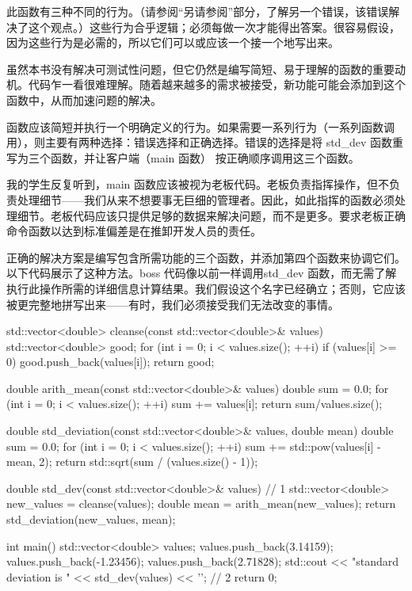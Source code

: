 
此函数有三种不同的行为。（请参阅“另请参阅”部分，了解另一个错误，该错误解决了这个观点。）这些行为合乎逻辑；必须每做一次才能得出答案。很容易假设，因为这些行为是必需的，所以它们可以或应该一个接一个地写出来。

虽然本书没有解决可测试性问题，但它仍然是编写简短、易于理解的函数的重要动机。代码乍一看很难理解。随着越来越多的需求被接受，新功能可能会添加到这个函数中，从而加速问题的解决。


函数应该简短并执行一个明确定义的行为。如果需要一系列行为（一系列函数调用），则主要有两种选择：错误选择和正确选择。错误的选择是将 std\_dev 函数重写为三个函数，并让客户端（main 函数） 按正确顺序调用这三个函数。

我的学生反复听到，main 函数应该被视为老板代码。老板负责指挥操作，但不负责处理细节——我们从来不想要事无巨细的管理者。因此，如此指挥的函数必须处理细节。老板代码应该只提供足够的数据来解决问题，而不是更多。要求老板正确命令函数以达到标准偏差是在推卸开发人员的责任。

正确的解决方案是编写包含所需功能的三个函数，并添加第四个函数来协调它们。以下代码展示了这种方法。boss 代码像以前一样调用std\_dev 函数，而无需了解执行此操作所需的详细信息计算结果。我们假设这个名字已经确立；否则，它应该被更完整地拼写出来——有时，我们必须接受我们无法改变的事情。


\begin{cpp}
std::vector<double> cleanse(const std::vector<double>& values) {
  std::vector<double> good;
  for (int i = 0; i < values.size(); ++i)
    if (values[i] >= 0)
      good.push_back(values[i]);
  return good;
}

double arith_mean(const std::vector<double>& values) {
  double sum = 0.0;
  for (int i = 0; i < values.size(); ++i)
    sum += values[i];
  return sum/values.size();
}

double std_deviation(const std::vector<double>& values, double mean) {
  double sum = 0.0;
  for (int i = 0; i < values.size(); ++i)
    sum += std::pow(values[i] - mean, 2);
  return std::sqrt(sum / (values.size() - 1));
}

double std_dev(const std::vector<double>& values) { // 1
  std::vector<double> new_values = cleanse(values);
  double mean = arith_mean(new_values);
  return std_deviation(new_values, mean);
}

int main() {
  std::vector<double> values;
  values.push_back(3.14159);
  values.push_back(-1.23456);
  values.push_back(2.71828);
  std::cout << "standard deviation is " <<
    std_dev(values) << '\n'; // 2
  return 0;
}
\end{cpp}

